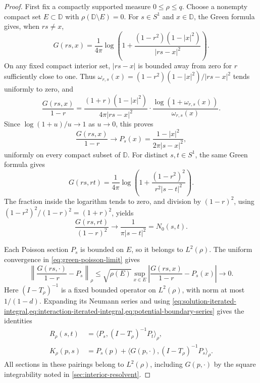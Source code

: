\begin{proof}
First fix a compactly supported measure $0\le\rho\le q$.
Choose a nonempty compact set $E\subset\mathbb D$ with
$\rho(\mathbb D\setminus E)=0$. For $s\in S^1$ and $x\in\mathbb D$,
the Green formula gives, when $rs\ne x$,
\[
 G(rs,x)=\frac1{4\pi}\log\left(
 1+\frac{(1-r^2)(1-|x|^2)}{|rs-x|^2}\right).
\]
On any fixed compact interior set, $|rs-x|$ is bounded away from
zero for $r$ sufficiently close to one. Thus
$\omega_{r,s}(x)=(1-r^2)(1-|x|^2)/|rs-x|^2$ tends uniformly to
zero, and
\[
 \frac{G(rs,x)}{1-r}
 =\frac{(1+r)(1-|x|^2)}{4\pi|rs-x|^2}\cdot
   \frac{\log(1+\omega_{r,s}(x))}{\omega_{r,s}(x)}.
\]
Since $\log(1+u)/u\to1$ as $u\to0$, this proves
\begin{equation}\label{eq:green-poisson-limit}
 \frac{G(rs,x)}{1-r}\longrightarrow
 P_s(x)=\frac{1-|x|^2}{2\pi|s-x|^2},
\end{equation}
uniformly on every compact subset of $\mathbb D$.
For distinct $s,t\in S^1$, the same Green formula gives
\[
 G(rs,rt)=\frac1{4\pi}\log\left(
 1+\frac{(1-r^2)^2}{r^2|s-t|^2}\right).
\]
The fraction inside the logarithm tends to zero, and division by
$(1-r)^2$, using $(1-r^2)^2/(1-r)^2=(1+r)^2$, yields
\begin{equation}\label{eq:green-boundary-limit}
 \frac{G(rs,rt)}{(1-r)^2}\longrightarrow
 \frac1{\pi|s-t|^2}=N_0(s,t).
\end{equation}

Each Poisson section $P_s$ is bounded on $E$, so it belongs to
$L^2(\rho)$. The uniform convergence in
\eqref{eq:green-poisson-limit} gives
\begin{equation}\label{eq:poisson-section-convergence}
 \left\|\frac{G(rs,\cdot)}{1-r}-P_s\right\|_\rho
 \le\sqrt{\rho(E)}\sup_{x\in E}
 \left|\frac{G(rs,x)}{1-r}-P_s(x)\right|\longrightarrow0.
\end{equation}
Here $(I-T_\rho)^{-1}$ is a fixed bounded operator on $L^2(\rho)$,
with norm at most $1/(1-d)$. Expanding its Neumann series and
using \cref{eq:solution-iterated-integral,eq:interaction-iterated-integral,eq:potential-boundary-series}
gives the identities
\begin{equation}\label{eq:compact-boundary-pairings}
 \begin{aligned}
 R_\rho(s,t)&=\langle P_s,(I-T_\rho)^{-1}P_t\rangle_\rho,\\
 K_\rho(p,s)&=P_s(p)+
 \langle G(p,\cdot),(I-T_\rho)^{-1}P_s\rangle_\rho.
 \end{aligned}
\end{equation}
All sections in these pairings belong to $L^2(\rho)$, including
$G(p,\cdot)$ by the square integrability noted in \cref{sec:interior-resolvent}.


\end{proof}
